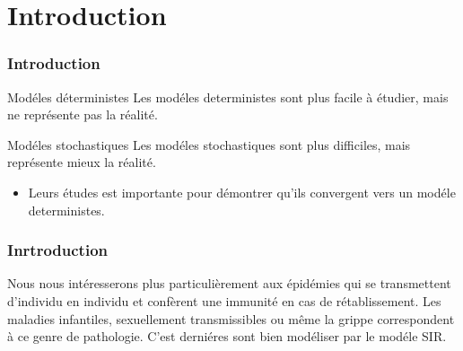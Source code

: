 \section{Introduction}

\begin{frame}
    \frametitle{Introduction}

    \begin{block}{Modéles déterministes}
        Les modéles deterministes sont plus facile à étudier, mais ne représente pas la réalité.
    \end{block}


    \begin{block}{Modéles stochastiques}
        Les modéles stochastiques sont plus difficiles, mais représente mieux la réalité.

        \begin{itemize}
            \item Leurs études est importante pour démontrer qu'ils convergent vers un modéle deterministes.
        \end{itemize}
    \end{block}
\end{frame}

\begin{frame}
    \frametitle{Inrtroduction}

    Nous nous intéresserons plus particulièrement aux épidémies qui se transmettent d’individu en individu et confèrent une immunité en cas de rétablissement. Les maladies infantiles, sexuellement transmissibles ou même la grippe correspondent à ce genre de pathologie. C'est derniéres sont bien modéliser par le modéle SIR.

\end{frame}

